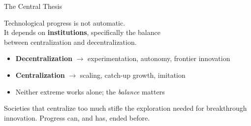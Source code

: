 \documentclass[aspectratio=169, 11pt]{beamer}
\begin{document}
\begin{frame}{The Central Thesis}
    \begin{center}
        \Large
        Technological progress is not automatic. \\[0.5em]
        It depends on \textbf{institutions}, specifically the balance \\
        between \alert{centralization} and \alert{decentralization}.
    \end{center}

    \vspace{1em}
    \pause

    \begin{itemize}
        \item \textbf{Decentralization} $\rightarrow$ experimentation, autonomy, frontier innovation
        \item \textbf{Centralization} $\rightarrow$ scaling, catch-up growth, imitation
        \item Neither extreme works alone; the \textit{balance} matters
    \end{itemize}

    \pause
    \vspace{0.5em}

    \begin{block}{}
        Societies that centralize too much stifle the exploration needed for breakthrough innovation. Progress can, and has, ended before.
    \end{block}
\end{frame}
\end{document}
